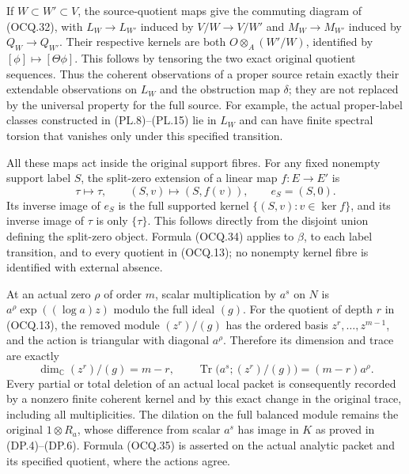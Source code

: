 If $W\subset W'\subset V$, the source-quotient maps give the commuting
diagram of (OCQ.32), with
$L_W\to L_{W'}$ induced by $V/W\to V/W'$ and
$M_W\to M_{W'}$ induced by $Q_W\to Q_{W'}$.
Their respective kernels are both
$O\otimes_A(W'/W)$, identified by $[\phi]\mapsto[\Theta\phi]$.
This follows by tensoring the two exact original quotient sequences.
Thus the coherent observations of a proper source retain exactly their
extendable observations on $L_W$ and the obstruction map $\delta$;
they are not replaced by the universal property for the full source.
For example, the actual proper-label classes constructed in
(PL.8)--(PL.15) lie in $L_W$ and can have finite spectral torsion that
vanishes only under this specified transition.

All these maps act inside the original support fibres.  For any fixed
nonempty support label $S$, the split-zero extension of a linear map
$f:E\to E'$ is
\[
 \tau\longmapsto\tau,\qquad
 (S,v)\longmapsto(S,f(v)),\qquad e_S=(S,0).                   \tag{OCQ.34}
\]
Its inverse image of $e_S$ is the full supported kernel
$\{(S,v):v\in\ker f\}$, and its inverse image of $\tau$ is only
$\{\tau\}$.  This follows directly from the disjoint union defining
the split-zero object.  Formula (OCQ.34) applies to $\beta$, to each
label transition, and to every quotient in (OCQ.13); no nonempty
kernel fibre is identified with external absence.

At an actual zero $\rho$ of order $m$, scalar multiplication by
$a^s$ on $N$ is
$a^\rho\exp((\log a)z)$ modulo the full ideal $(g)$.
For the quotient of depth $r$ in (OCQ.13), the removed module
$(z^r)/(g)$ has the ordered basis
$z^r,\ldots,z^{m-1}$, and the action is triangular with diagonal
$a^\rho$.  Therefore its dimension and trace are exactly
\[
 \dim_{\mathbb C}(z^r)/(g)=m-r,
 \qquad\operatorname{Tr}\bigl(a^s;(z^r)/(g)\bigr)
                 =(m-r)a^\rho.                              \tag{OCQ.35}
\]
Every partial or total deletion of an actual local packet is consequently
recorded by a nonzero finite coherent kernel and by this exact change in
the original trace, including all multiplicities.
The dilation on the full balanced module remains the original
$1\otimes R_a$, whose difference from scalar $a^s$ has image in $K$
as proved in (DP.4)--(DP.6).  Formula (OCQ.35) is asserted on the actual
analytic packet and its specified quotient, where the actions agree.


